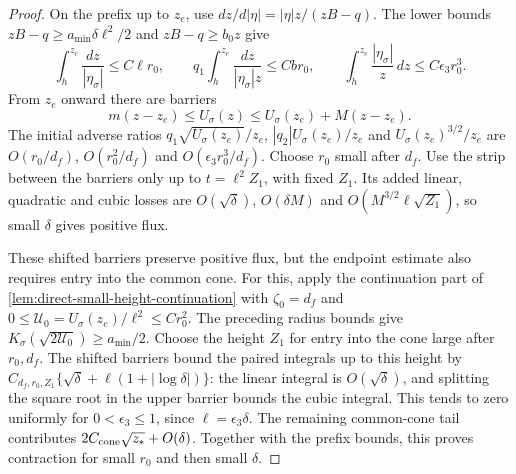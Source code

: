 \begin{proof}
On the prefix up to \(z_e\), use
\(dz/d|\eta|=|\eta|z/(zB-q)\). The lower bounds
\(zB-q\ge a_{\min}\delta\ell^2/2\) and \(zB-q\ge b_0z\) give
\[
 \int_h^{z_e}\frac{dz}{|\eta_\sigma|}\le C\ell r_0,\qquad
 q_1\int_h^{z_e}\frac{dz}{|\eta_\sigma|z}\le Cbr_0,\qquad
 \int_h^{z_e}\frac{|\eta_\sigma|}{z}\,dz\le C\epsilon_3 r_0^3 .
\]
From \(z_e\) onward there are barriers
\begin{equation}
\label{eq:direct-primary-shifted-cones}
 m(z-z_e)\le U_\sigma(z)
               \le U_\sigma(z_e)+M(z-z_e).
\end{equation}
The initial adverse ratios
\(q_1\sqrt{U_\sigma(z_e)}/z_e\), \(|q_2|U_\sigma(z_e)/z_e\) and
\(U_\sigma(z_e)^{3/2}/z_e\) are \(O(r_0/d_f)\), \(O(r_0^2/d_f)\) and
\(O(\epsilon_3 r_0^3/d_f)\). Choose \(r_0\) small after \(d_f\).
Use the strip between the barriers only up to \(t=\ell^2Z_1\),
with fixed \(Z_1\). Its added linear, quadratic and cubic losses are
\(O(\sqrt\delta)\), \(O(\delta M)\) and \(O(M^{3/2}\ell\sqrt{Z_1})\),
so small \(\delta\) gives positive flux.

These shifted barriers preserve positive flux, but the endpoint
estimate also requires entry into the common cone. For this, apply
the continuation part of
\cref{lem:direct-small-height-continuation} with \(\zeta_0=d_f\) and
\(0\le \mathcal U_0=U_\sigma(z_e)/\ell^2\le Cr_0^2\).
The preceding radius bounds give
\(K_\sigma(\sqrt{2\mathcal U_0})\ge a_{\min}/2\).
Choose the height \(Z_1\) for entry into the cone large after
\(r_0,d_f\). The shifted barriers
bound the paired integrals up to this height by
\(C_{d_f,r_0,Z_1}\{\sqrt\delta+\ell(1+|\log\delta|)\}\):
the linear integral is \(O(\sqrt\delta)\), and splitting the square
root in the upper barrier bounds the cubic integral. This tends to zero
uniformly for \(0<\epsilon_3\le1\), since \(\ell=\epsilon_3\delta\).
The remaining common-cone tail contributes
\(2C_{\rm cone}\sqrt{z_*}+O(\delta)\). Together with the prefix
bounds, this proves contraction for small \(r_0\) and then small
\(\delta\).
\end{proof}
